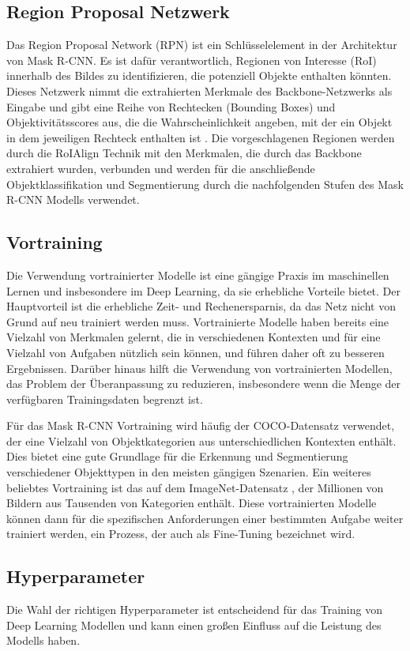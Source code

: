 \subsection{Region Proposal Netzwerk}
Das Region Proposal Network (RPN) ist ein Schlüsselelement in der Architektur von Mask R-CNN. Es ist dafür verantwortlich, Regionen von Interesse (RoI) innerhalb des Bildes zu identifizieren, die potenziell Objekte enthalten könnten. Dieses Netzwerk nimmt die extrahierten Merkmale des Backbone-Netzwerks als Eingabe und gibt eine Reihe von Rechtecken (Bounding Boxes) und Objektivitätsscores aus, die die Wahrscheinlichkeit angeben, mit der ein Objekt in dem jeweiligen Rechteck enthalten ist \cite{Hosang_2016}.
Die vorgeschlagenen Regionen werden durch die RoIAlign Technik mit den Merkmalen, die durch das Backbone extrahiert wurden, verbunden und werden für die anschließende Objektklassifikation und Segmentierung durch die nachfolgenden Stufen des Mask R-CNN Modells verwendet.

\subsection{Vortraining}
Die Verwendung vortrainierter Modelle ist eine gängige Praxis im maschinellen Lernen und insbesondere im Deep Learning, da sie erhebliche Vorteile bietet. Der Hauptvorteil ist die erhebliche Zeit- und Rechenersparnis, da das Netz nicht von Grund auf neu trainiert werden muss. Vortrainierte Modelle haben bereits eine Vielzahl von Merkmalen gelernt, die in verschiedenen Kontexten und für eine Vielzahl von Aufgaben nützlich sein können, und führen daher oft zu besseren Ergebnissen.
Darüber hinaus hilft die Verwendung von vortrainierten Modellen, das Problem der Überanpassung zu reduzieren, insbesondere wenn die Menge der verfügbaren Trainingsdaten begrenzt ist.

Für das Mask R-CNN Vortraining wird häufig der COCO-Datensatz \cite{coco} verwendet, der eine Vielzahl von Objektkategorien aus unterschiedlichen Kontexten enthält. Dies bietet eine gute Grundlage für die Erkennung und Segmentierung verschiedener Objekttypen in den meisten gängigen Szenarien. Ein weiteres beliebtes Vortraining ist das auf dem ImageNet-Datensatz \cite{deng2009imagenet}, der Millionen von Bildern aus Tausenden von Kategorien enthält. Diese vortrainierten Modelle können dann für die spezifischen Anforderungen einer bestimmten Aufgabe weiter trainiert werden, ein Prozess, der auch als Fine-Tuning bezeichnet wird.
\subsection{Hyperparameter}
Die Wahl der richtigen Hyperparameter ist entscheidend für das Training von Deep Learning Modellen und kann einen großen Einfluss auf die Leistung des Modells haben.

